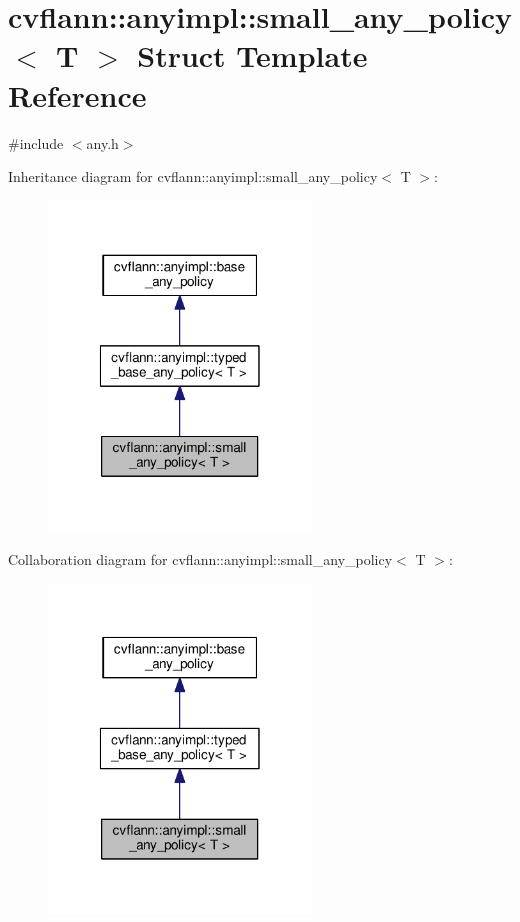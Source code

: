 \hypertarget{structcvflann_1_1anyimpl_1_1small__any__policy}{\section{cvflann\-:\-:anyimpl\-:\-:small\-\_\-any\-\_\-policy$<$ T $>$ Struct Template Reference}
\label{structcvflann_1_1anyimpl_1_1small__any__policy}
}


{\ttfamily \#include $<$any.\-h$>$}



Inheritance diagram for cvflann\-:\-:anyimpl\-:\-:small\-\_\-any\-\_\-policy$<$ T $>$\-:\nopagebreak
\begin{figure}[H]
\begin{center}
\leavevmode
\includegraphics[width=198pt]{structcvflann_1_1anyimpl_1_1small__any__policy__inherit__graph}
\end{center}
\end{figure}


Collaboration diagram for cvflann\-:\-:anyimpl\-:\-:small\-\_\-any\-\_\-policy$<$ T $>$\-:\nopagebreak
\begin{figure}[H]
\begin{center}
\leavevmode
\includegraphics[width=198pt]{structcvflann_1_1anyimpl_1_1small__any__policy__coll__graph}
\end{center}
\end{figure}
